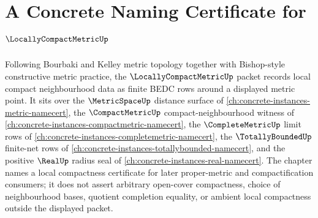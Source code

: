 \chapter{A Concrete Naming Certificate for $\LocallyCompactMetricUp$}
\label{ch:concrete-instances-locally-compact-metric-namecert}

Following Bourbaki and Kelley metric topology together with Bishop-style constructive metric practice, the $\LocallyCompactMetricUp$ packet records local compact neighbourhood data as finite BEDC rows around a displayed metric point. It sits over the $\MetricSpaceUp$ distance surface of \autoref{ch:concrete-instances-metric-namecert}, the $\CompactMetricUp$ compact-neighbourhood witness of \autoref{ch:concrete-instances-compactmetric-namecert}, the $\CompleteMetricUp$ limit rows of \autoref{ch:concrete-instances-completemetric-namecert}, the $\TotallyBoundedUp$ finite-net rows of \autoref{ch:concrete-instances-totallybounded-namecert}, and the positive $\RealUp$ radius seal of \autoref{ch:concrete-instances-real-namecert}. The chapter names a local compactness certificate for later proper-metric and compactification consumers; it does not assert arbitrary open-cover compactness, choice of neighbourhood bases, quotient completion equality, or ambient local compactness outside the displayed packet.

